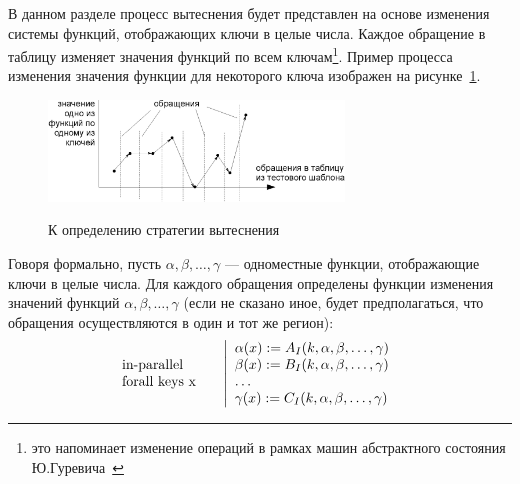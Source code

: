 
В данном разделе процесс вытеснения будет представлен на основе изменения  системы функций, отображающих ключи в целые числа. Каждое обращение в таблицу изменяет значения функций по всем ключам\footnote{это напоминает изменение операций в рамках машин абстрактного состояния Ю.Гуревича~\cite{ASM}}. Пример процесса изменения значения функции для некоторого ключа изображен на рисунке~\ref{fig:graphic}.

\begin{figure}[h] \center
  \includegraphics[width=0.7\textwidth]{2.theor/graphic}\\
  \caption{К определению стратегии вытеснения}\label{fig:graphic}
\end{figure}

Говоря формально, пусть $\alpha, \beta, \dots, \gamma$ --- одноместные функции,
отображающие ключи в целые числа. Для каждого обращения определены функции
изменения значений функций $\alpha, \beta, \dots, \gamma$ (если не сказано иное, будет предполагаться, что обращения осуществляются в один и тот же регион):
$$\parbox{2.5cm}{in-parallel\\forall keys x~}\left|\begin{array}{l}
\alpha(x) := A_I(k, \alpha, \beta, \dots, \gamma)\\
\beta(x) := B_I(k, \alpha, \beta, \dots, \gamma)\\
\dots\\
\gamma(x) := C_I(k, \alpha, \beta, \dots, \gamma)\\
\end{array}\right.
$$

